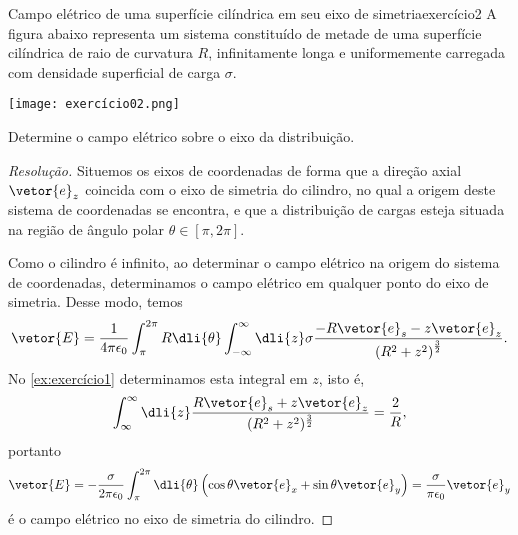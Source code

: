 \begin{exercício}{Campo elétrico de uma superfície cilíndrica em seu eixo de simetria}{exercício2}
    A figura abaixo representa um sistema constituído de metade de uma superfície cilíndrica de raio de curvatura \(R\), infinitamente longa e uniformemente carregada com densidade superficial de carga \(\sigma\).
    \begin{center}
        \texttt{[image: exercício02.png]}
    \end{center}
    Determine o campo elétrico sobre o eixo da distribuição.
\end{exercício}
\begin{proof}[Resolução]
    Situemos os eixos de coordenadas de forma que a direção axial \(\vetor{e}_z\) coincida com o eixo de simetria do cilindro, no qual a origem deste sistema de coordenadas se encontra, e que a distribuição de cargas esteja situada na região de ângulo polar \(\theta \in [\pi, 2\pi]\).

    Como o cilindro é infinito, ao determinar o campo elétrico na origem do sistema de coordenadas, determinamos o campo elétrico em qualquer ponto do eixo de simetria. Desse modo, temos
    \begin{equation*}
        \vetor{E} = \frac{1}{4\pi \epsilon_0} \int_\pi^{2\pi} R\dli{\theta} \int_{-\infty}^{\infty} \dli{z} \sigma \frac{-R \vetor{e}_s - z\vetor{e}_z}{\left(R^2 + z^2\right)^{\frac32}}.
    \end{equation*}
    No \cref{ex:exercício1} determinamos esta integral em \(z\), isto é,
    \begin{equation*}
        \int_{\infty}^\infty \dli{z} \frac{R \vetor{e}_s + z \vetor{e}_z}{(R^2 + z^2)^{\frac32}} = \frac{2}{R},
    \end{equation*}
    portanto
    \begin{equation*}
        \vetor{E} = -\frac{\sigma}{2\pi \epsilon_0} \int_{\pi}^{2\pi} \dli{\theta} \left(\cos\theta\vetor{e}_x + \sin\theta \vetor{e}_y\right) = \frac{\sigma}{\pi \epsilon_0}\vetor{e}_y
    \end{equation*}
    é o campo elétrico no eixo de simetria do cilindro.
\end{proof}
